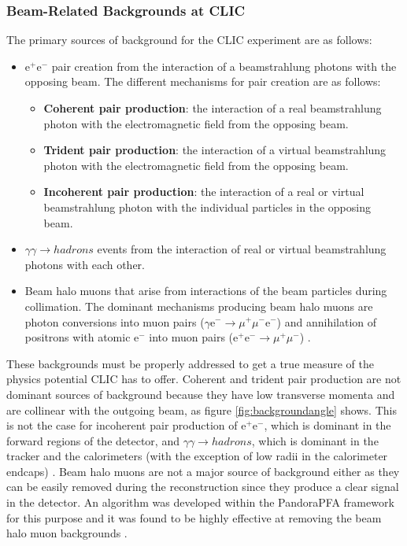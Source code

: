 
\subsubsection{Beam-Related Backgrounds at CLIC}
\label{sec:beamrelatedbackgrounds}
The primary sources of background for the CLIC experiment are as follows:
\begin{itemize}
\item $\text{e}^{+}\text{e}^{-}$ pair creation from the interaction of a beamstrahlung photons with the opposing beam.  The different mechanisms for pair creation are as follows:
\begin{itemize}
\item \textbf{Coherent pair production}: the interaction of a real beamstrahlung photon with the electromagnetic field from the opposing beam.
\item \textbf{Trident pair production}: the interaction of a virtual beamstrahlung photon with the electromagnetic field from the opposing beam.
\item \textbf{Incoherent pair production}: the interaction of a real or virtual beamstrahlung photon with the individual particles in the opposing beam.
\end{itemize}
\item $\gamma\gamma \rightarrow hadrons$ events from the interaction of real or virtual beamstrahlung photons with each other.  
\item Beam halo muons that arise from interactions of the beam particles during collimation.  The dominant mechanisms producing beam halo muons are photon conversions into muon pairs ($\gamma \text{e}^{-} \rightarrow \mu^{+}\mu^{-}\text{e}^{-}$) and annihilation of positrons with atomic $\text{e}^{-}$ into muon pairs ($\text{e}^{+}\text{e}^{-} \rightarrow \mu^{+}\mu^{-}$) \cite{Pilicer:2015ijy}.
\end{itemize}

These backgrounds must be properly addressed to get a true measure of the physics potential CLIC has to offer.  Coherent and trident pair production are not dominant sources of background because they have low transverse momenta and are collinear with the outgoing beam, as figure \ref{fig:backgroundangle} shows.  This is not the case for incoherent pair production of $\text{e}^{+}\text{e}^{-}$, which is dominant in the forward regions of the detector, and $\gamma\gamma \rightarrow hadrons$, which is dominant in the tracker and the calorimeters (with the exception of low radii in the calorimeter endcaps) \cite{Linssen:2012hp, Sailer:2012mfa}.  Beam halo muons are not a major source of background either as they can be easily removed during the reconstruction since they produce a clear signal in the detector.  An algorithm was developed within the PandoraPFA framework for this purpose and it was found to be highly effective at removing the beam halo muon backgrounds \cite{Linssen:2012hp}.  

